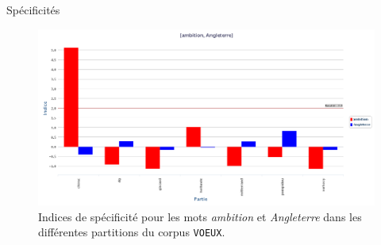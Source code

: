 \documentclass[xetex,xcolor={table,usenames,dvipsnames}]{beamer}
\begin{document}
\begin{frame}{Spécificités}
	\begin{figure}[h] %
		\centering
		\includegraphics[width=1\linewidth]{img/ambition_angleterre.png}
		\caption{Indices de spécificité pour les mots \textit{ambition} et \textit{Angleterre} dans les différentes partitions du corpus \texttt{VOEUX}.}
		\label{fig:ling_out_TAL}
	\end{figure}
\end{frame}
\end{document}
